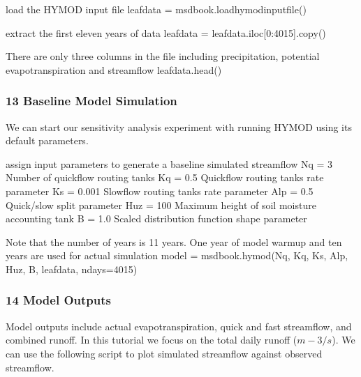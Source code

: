 \documentclass[letterpaper,10pt,english]{book}
\begin{document}
\begin{sphinxVerbatim}[commandchars=\\\{\}]
\PYGZsh{} load the HYMOD input file
leaf\PYGZus{}data = msdbook.load\PYGZus{}hymod\PYGZus{}input\PYGZus{}file()

\PYGZsh{} extract the first eleven years of data
leaf\PYGZus{}data = leaf\PYGZus{}data.iloc[0:4015].copy()
\end{sphinxVerbatim}

\begin{sphinxVerbatim}[commandchars=\\\{\}]
\PYGZsh{} There are only three columns in the file including precipitation, potential evapotranspiration and  streamflow
leaf\PYGZus{}data.head()
\end{sphinxVerbatim}




\subsubsection{1\sphinxhyphen{}3 Baseline Model Simulation}
\label{\detokenize{A2_Jupyter_Notebooks:baseline-model-simulation}}
\sphinxAtStartPar
We can start our sensitivity analysis experiment with running HYMOD
using its default parameters.

\begin{sphinxVerbatim}[commandchars=\\\{\}]
\PYGZsh{} assign input parameters to generate a baseline simulated streamflow
Nq = 3  \PYGZsh{} Number of quickflow routing tanks
Kq = 0.5 \PYGZsh{} Quickflow routing tanks\PYGZsq{} rate parameter
Ks =  0.001 \PYGZsh{} Slowflow routing tank\PYGZsq{}s rate parameter
Alp = 0.5 \PYGZsh{} Quick/slow split parameter
Huz = 100 \PYGZsh{} Maximum height of soil moisture accounting tank
B = 1.0 \PYGZsh{} Scaled distribution function shape parameter

\PYGZsh{} Note that the number of years is 11 years. One year of model warm\PYGZhy{}up and ten years are used for actual simulation
model = msdbook.hymod(Nq, Kq, Ks, Alp, Huz, B, leaf\PYGZus{}data, ndays=4015)
\end{sphinxVerbatim}


\subsubsection{1\sphinxhyphen{}4 Model Outputs}
\label{\detokenize{A2_Jupyter_Notebooks:model-outputs}}
\sphinxAtStartPar
Model outputs include actual evapotranspiration, quick and fast
streamflow, and combined runoff. In this tutorial we focus on the total
daily runoff (\(m-3/s\)). We can use the following script to plot
simulated streamflow against observed streamflow.
\end{document}
